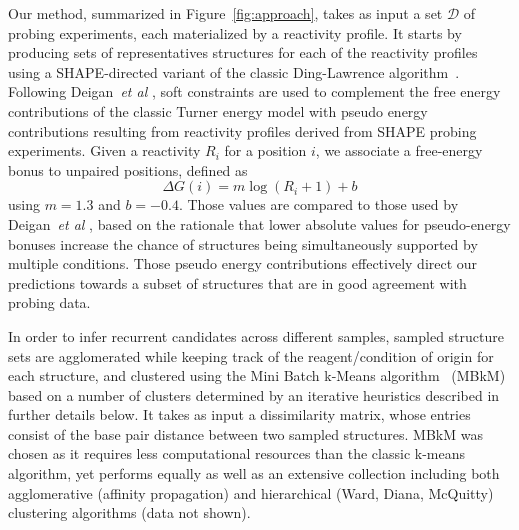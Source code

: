 \documentclass[a4,center,fleqn]{NAR}
\newcommand{\CL}{MBkM\xspace}
\newcommand{\etal}{~\emph{et al} }
\begin{document}
Our method, summarized in Figure~\ref{fig:approach}, takes as input a set $\mathcal{D}$ of probing experiments, each materialized by a reactivity profile. It starts by producing sets of representatives structures for each of the reactivity profiles using a SHAPE-directed variant of the classic Ding-Lawrence algorithm~\citep{Ding2003}. Following Deigan\etal\cite{Deigan2009}, soft constraints are used to complement the free energy contributions of the classic Turner energy model with pseudo energy contributions resulting from reactivity profiles derived from SHAPE probing experiments.  Given a reactivity $R_i$ for a position $i$, we associate a free-energy bonus to unpaired positions, defined as
$$\Delta G(i) = m \log(R_i +1 )+b$$ 
using $m=1.3$ and  $b=-0.4$. Those values are compared to those used by Deigan\etal\cite{Deigan2009}, based on the rationale that lower absolute values for pseudo-energy bonuses increase the chance of structures being simultaneously supported by multiple conditions. Those pseudo energy contributions effectively direct our predictions towards a subset of structures that are in good agreement with probing data. 

In order to infer recurrent candidates across different samples, sampled structure sets are agglomerated while keeping track of the reagent/condition of origin for each structure, and clustered using the Mini Batch k-Means algorithm~\citep{Sculley2010} (\CL{}) based on a number of clusters determined by an iterative heuristics described in further details below. 
It takes as input a dissimilarity matrix, whose entries consist of the base pair distance between two sampled structures.
\CL{} was chosen as it requires less computational resources than the classic k-means algorithm, yet performs equally as well as an extensive collection including  both agglomerative (affinity propagation) and hierarchical (Ward, Diana, McQuitty) clustering algorithms (data not shown). 
\end{document}

